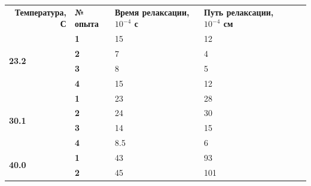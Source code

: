 \documentclass[a4paper]{article}
\begin{document}
\begin{table}[h]
\begin{tabular}{|l|l|l|l|ll}
\cline{1-4}
\multicolumn{1}{|r|}{\textbf{Температура, С}} & \textbf{№ опыта} & \textbf{Время релаксации, $10^{-4}$ с} & \textbf{Путь релаксации, $10^{-4}$ см} & \textbf{} & \textbf{} \\ \cline{1-4}
\multirow{4}{*}{\textbf{23.2}}                & \textbf{1}       & 15                                  & 12                                 &           & \textbf{} \\ \cline{2-4}
                                              & \textbf{2}       & 7                                   & 4                                  &           & \textbf{} \\ \cline{2-4}
                                              & \textbf{3}       & 8                                   & 5                                  &           & \textbf{} \\ \cline{2-4}
                                              & \textbf{4}       & 15                                  & 12                                 &           & \textbf{} \\ \cline{1-4}
\multirow{4}{*}{\textbf{30.1}}                & \textbf{1}       & 23                                  & 28                                 &           & \textbf{} \\ \cline{2-4}
                                              & \textbf{2}       & 24                                  & 30                                 &           &           \\ \cline{2-4}
                                              & \textbf{3}       & 14                                  & 15                                 &           &           \\ \cline{2-4}
                                              & \textbf{4}       & 8.5                                 & 6                                  &           &           \\ \cline{1-4}
\multirow{4}{*}{\textbf{40.0}}                & \textbf{1}       & 43                                  & 93                                 &           &           \\ \cline{2-4}
                                              & \textbf{2}       & 45                                  & 101                                &           &           \\ \cline{2-4}

\end{tabular}
\end{table}
\end{document}
